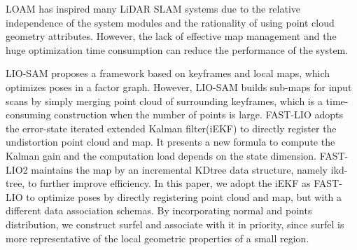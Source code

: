 \documentclass[letterpaper, 10 pt, conference]{ieeeconf}  %
\begin{document}
LOAM\cite{zhang2014loam} has inspired many LiDAR SLAM systems due to the relative independence of the system modules and the rationality of using point cloud geometry attributes.
However, the lack of effective map management and the huge optimization time consumption can reduce the performance of the system.

LIO-SAM proposes a framework based on keyframes and local maps, which optimizes poses in a factor graph\cite{kaess2012isam2}.
However, LIO-SAM builds sub-maps for input scans by simply merging point cloud of surrounding keyframes, which is a time-consuming construction when the number of points is large.
FAST-LIO\cite{xu2021fast} adopts the error-state iterated extended Kalman filter(iEKF) to directly register the undistortion point cloud and map.
It presents a new formula to compute the Kalman gain and the computation load depends on the state dimension.
FAST-LIO2\cite{xu2022fast} maintains the map by an incremental KDtree data structure, namely ikd-tree, to further improve efficiency.
In this paper, we adopt the iEKF as FAST-LIO to optimize poses by directly registering point cloud and map, but with a different data association schemas.
By incorporating normal and points distribution, we construct surfel and associate with it in priority, since surfel is more representative of the local geometric properties of a small region.
\end{document}
